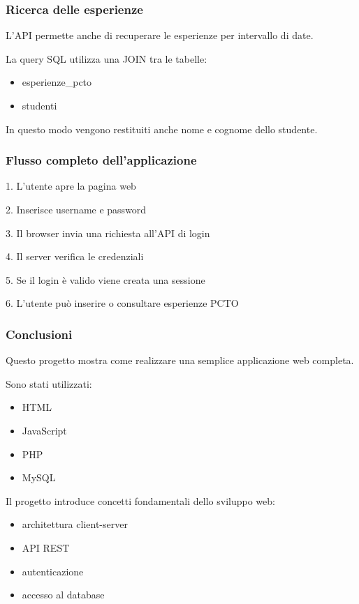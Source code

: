 \documentclass{beamer}
\begin{document}
	
	\begin{frame}
		\frametitle{Ricerca delle esperienze}
		
		L'API permette anche di recuperare
		le esperienze per intervallo di date.
		
		La query SQL utilizza una JOIN tra
		le tabelle:
		
		\begin{itemize}
			\item esperienze\_pcto
			\item studenti
		\end{itemize}
		
		In questo modo vengono restituiti
		anche nome e cognome dello studente.
		
	\end{frame}
	
	
	\begin{frame}
		\frametitle{Flusso completo dell'applicazione}
		
		1. L'utente apre la pagina web
		
		2. Inserisce username e password
		
		3. Il browser invia una richiesta all'API di login
		
		4. Il server verifica le credenziali
		
		5. Se il login è valido viene creata una sessione
		
		6. L'utente può inserire o consultare esperienze PCTO
		
	\end{frame}
	
	
	\begin{frame}
		\frametitle{Conclusioni}
		
		Questo progetto mostra come realizzare
		una semplice applicazione web completa.
		
		Sono stati utilizzati:
		
		\begin{itemize}
			\item HTML
			\item JavaScript
			\item PHP
			\item MySQL
		\end{itemize}
		
		Il progetto introduce concetti fondamentali
		dello sviluppo web:
		
		\begin{itemize}
			\item architettura client-server
			\item API REST
			\item autenticazione
			\item accesso al database
		\end{itemize}
		
	\end{frame}
	
\end{document}
